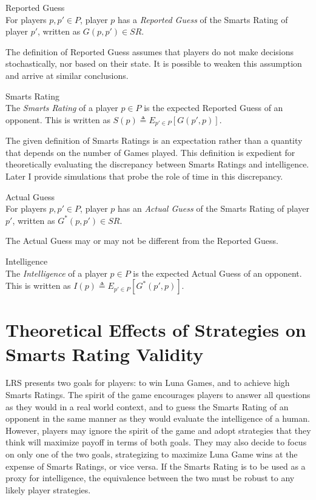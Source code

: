 \theoremstyle{definition}
\begin{definition}{Reported Guess}\\
For players $p, p' \in P$, player $p$ has a \textit{Reported Guess} of the Smarts Rating of player $p'$, written as $G(p, p') \in SR$.
\end{definition}

\noindent The definition of Reported Guess assumes that players do not make decisions stochastically, nor based on their state. It is possible to weaken this assumption and arrive at similar conclusions.

\theoremstyle{definition}
\begin{definition}{Smarts Rating}\\
The \textit{Smarts Rating} of a player $p \in P$ is the expected Reported Guess of an opponent. This is written as $S(p) \triangleq E_{p' \in P}[G(p', p)]$.
\end{definition}

\noindent The given definition of Smarts Ratings is an expectation rather than a quantity that depends on the number of Games played. This definition is expedient for theoretically evaluating the discrepancy between Smarts Ratings and intelligence. Later I provide simulations that probe the role of time in this discrepancy.

\theoremstyle{definition}
\begin{definition}{Actual Guess}\\
For players $p, p' \in P$, player $p$ has an \textit{Actual Guess} of the Smarts Rating of player $p'$, written as $G^*(p, p') \in SR$.
\end{definition}

\noindent The Actual Guess may or may not be different from the Reported Guess.

\theoremstyle{definition}
\begin{definition}{Intelligence}\\
The \textit{Intelligence} of a player $p \in P$ is the expected Actual Guess of an opponent. This is written as $I(p) \triangleq E_{p' \in P}[G^*(p', p)]$.
\end{definition}

\section{Theoretical Effects of Strategies on Smarts Rating Validity}

LRS presents two goals for players: to win Luna Games, and to achieve high Smarts Ratings. The spirit of the game encourages players to answer all questions as they would in a real world context, and to guess the Smarts Rating of an opponent in the same manner as they would evaluate the intelligence of a human. However, players may ignore the spirit of the game and adopt strategies that they think will maximize payoff in terms of both goals. They may also decide to focus on only one of the two goals, strategizing to maximize Luna Game wins at the expense of Smarts Ratings, or vice versa. If the Smarts Rating is to be used as a proxy for intelligence, the equivalence between the two must be robust to any likely player strategies.

